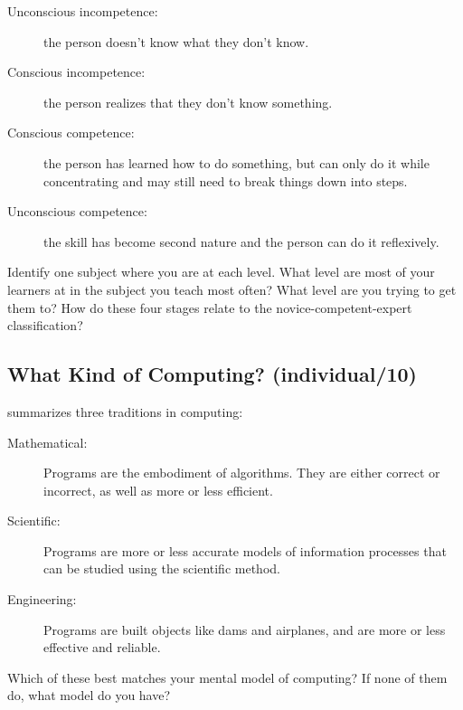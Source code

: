 \begin{description}

\item[Unconscious incompetence:]
  the person doesn't know what they don't know.

\item[Conscious incompetence:]
  the person realizes that they don't know something.

\item[Conscious competence:]
  the person has learned how to do something,
  but can only do it while concentrating
  and may still need to break things down into steps.

\item[Unconscious competence:]
  the skill has become second nature
  and the person can do it reflexively.

\end{description}

Identify one subject where you are at each level.
What level are most of your learners at in the subject you teach most often?
What level are you trying to get them to?
How do these four stages relate to the novice-competent-expert classification?

\subsection*{What Kind of Computing? (individual/10)}

\cite{Tedr2008} summarizes three traditions in computing:

\begin{description}

\item[Mathematical:]
  Programs are the embodiment of algorithms.
  They are either correct or incorrect,
  as well as more or less efficient.

\item[Scientific:]
  Programs are more or less accurate models of information processes
  that can be studied using the scientific method.

\item[Engineering:]
  Programs are built objects like dams and airplanes,
  and are more or less effective and reliable.

\end{description}

Which of these best matches your mental model of computing?
If none of them do, what model do you have?

